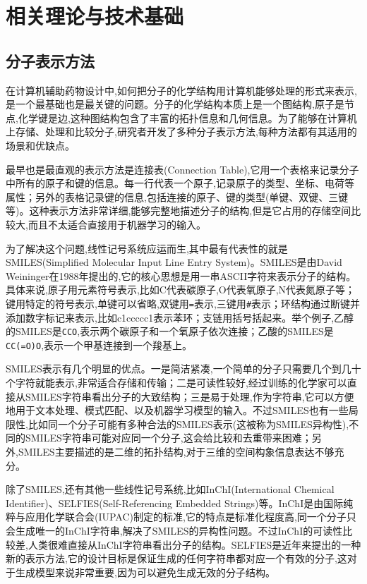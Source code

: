\chapter{相关理论与技术基础}
\vspace{7pt}


\section{分子表示方法}

在计算机辅助药物设计中,如何把分子的化学结构用计算机能够处理的形式来表示,是一个最基础也是最关键的问题。分子的化学结构本质上是一个图结构,原子是节点,化学键是边,这种图结构包含了丰富的拓扑信息和几何信息。为了能够在计算机上存储、处理和比较分子,研究者开发了多种分子表示方法,每种方法都有其适用的场景和优缺点。

最早也是最直观的表示方法是连接表(Connection Table),它用一个表格来记录分子中所有的原子和键的信息。每一行代表一个原子,记录原子的类型、坐标、电荷等属性；另外的表格记录键的信息,包括连接的原子、键的类型(单键、双键、三键等)。这种表示方法非常详细,能够完整地描述分子的结构,但是它占用的存储空间比较大,而且不太适合直接用于机器学习的输入。

为了解决这个问题,线性记号系统应运而生,其中最有代表性的就是SMILES(Simplified Molecular Input Line Entry System)。SMILES是由David Weininger在1988年提出的\cite{weininger1988smiles},它的核心思想是用一串ASCII字符来表示分子的结构。具体来说,原子用元素符号表示,比如C代表碳原子,O代表氧原子,N代表氮原子等；键用特定的符号表示,单键可以省略,双键用\texttt{=}表示,三键用\texttt{\#}表示；环结构通过断键并添加数字标记来表示,比如c1ccccc1表示苯环；支链用括号括起来。举个例子,乙醇的SMILES是\texttt{CCO},表示两个碳原子和一个氧原子依次连接；乙酸的SMILES是\texttt{CC(=O)O},表示一个甲基连接到一个羧基上。

SMILES表示有几个明显的优点。一是简洁紧凑,一个简单的分子只需要几个到几十个字符就能表示,非常适合存储和传输；二是可读性较好,经过训练的化学家可以直接从SMILES字符串看出分子的大致结构；三是易于处理,作为字符串,它可以方便地用于文本处理、模式匹配、以及机器学习模型的输入。不过SMILES也有一些局限性,比如同一个分子可能有多种合法的SMILES表示(这被称为SMILES异构性),不同的SMILES字符串可能对应同一个分子,这会给比较和去重带来困难；另外,SMILES主要描述的是二维的拓扑结构,对于三维的空间构象信息表达不够充分。

除了SMILES,还有其他一些线性记号系统,比如InChI(International Chemical Identifier)、SELFIES(Self-Referencing Embedded Strings)等。InChI是由国际纯粹与应用化学联合会(IUPAC)制定的标准,它的特点是标准化程度高,同一个分子只会生成唯一的InChI字符串,解决了SMILES的异构性问题。不过InChI的可读性比较差,人类很难直接从InChI字符串看出分子的结构。SELFIES是近年来提出的一种新的表示方法,它的设计目标是保证生成的任何字符串都对应一个有效的分子,这对于生成模型来说非常重要,因为可以避免生成无效的分子结构。

